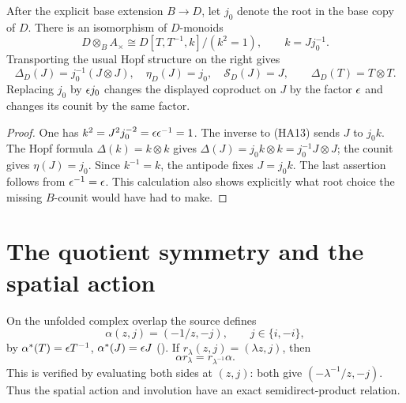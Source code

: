 \begin{proposition}
After the explicit base extension $B\to D$, let $j_0$ denote the root
in the base copy of $D$. There is an isomorphism of $D$-monoids
\begin{equation}\tag{HA13}
 D\otimes_B A_\times
       \cong D[T,T^{-1},k]/(k^2=1),
 \qquad k=Jj_0^{-1}.
\end{equation}
Transporting the usual Hopf structure on the right gives
\begin{equation}\tag{HA14}
 \Delta_D(J)=j_0^{-1}(J\otimes J),\quad
 \eta_D(J)=j_0,\quad \mathcal S_D(J)=J,
 \qquad \Delta_D(T)=T\otimes T.
\end{equation}
Replacing $j_0$ by $\epsilon j_0$ changes the displayed coproduct on $J$
by the factor $\epsilon$ and changes its counit by the same factor.
\end{proposition}
\begin{proof}
One has $k^2=J^2j_0^{-2}=\epsilon\epsilon^{-1}=1$.
The inverse to (HA13) sends $J$ to $j_0k$.
The Hopf formula $\Delta(k)=k\otimes k$ gives
$\Delta(J)=j_0 k\otimes k=j_0^{-1}J\otimes J$;
the counit gives $\eta(J)=j_0$. Since $k^{-1}=k$, the antipode
fixes $J=j_0k$. The last assertion follows from $\epsilon^{-1}=\epsilon$.
This calculation also shows explicitly what root choice the missing
$B$-counit would have had to make.
\end{proof}

\section{The quotient symmetry and the spatial action}

On the unfolded complex overlap the source defines
\begin{equation}\tag{HA15}
 \alpha(z,j)=(-1/z,-j),\qquad j\in\{i,-i\},
\end{equation}
by $\alpha^*(T)=\epsilon T^{-1}$, $\alpha^*(J)=\epsilon J$
(). If $r_\lambda(z,j)=(\lambda z,j)$,
then
\begin{equation}\tag{HA16}
 \alpha r_\lambda=r_{\lambda^{-1}}\alpha.
\end{equation}
This is verified by evaluating both sides at $(z,j)$: both give
$(-\lambda^{-1}/z,-j)$. Thus the spatial action and involution have an
exact semidirect-product relation.

